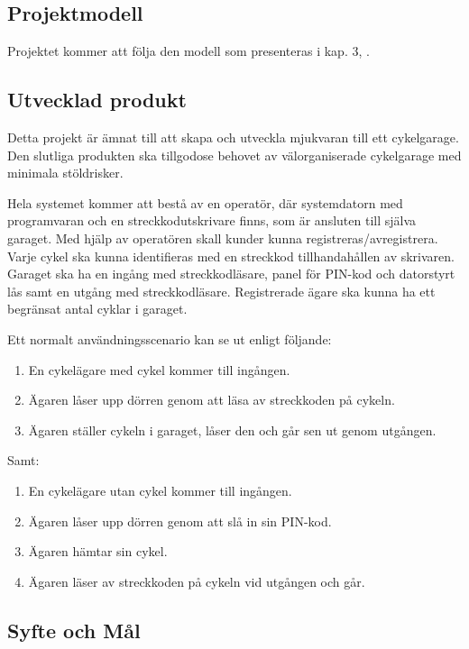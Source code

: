 \documentclass[a4paper]{article}
\begin{document}
\subsection{Projektmodell} %
Projektet kommer att följa den modell som presenteras i kap. 3, \cite{engproc}.

\subsection{Utvecklad produkt} %
Detta projekt är ämnat till att skapa och utveckla mjukvaran till ett cykelgarage. Den slutliga produkten ska
 tillgodose behovet av välorganiserade cykelgarage med minimala stöldrisker.

Hela systemet kommer att bestå av en operatör, där systemdatorn med programvaran och 
en streckkodutskrivare finns, som är ansluten till själva garaget. Med hjälp av operatören 
skall kunder kunna registreras/avregistrera. Varje cykel ska kunna identifieras med en 
streckkod tillhandahållen av skrivaren. Garaget ska ha en ingång med streckkodläsare, panel för 
PIN-kod och datorstyrt lås samt en utgång med streckkodläsare. Registrerade ägare ska kunna ha
 ett begränsat antal cyklar i garaget.

Ett normalt användningsscenario kan se ut enligt följande:

\begin{enumerate}
\item En cykelägare med cykel kommer till ingången.
\item Ägaren låser upp dörren genom att läsa av streckkoden på cykeln.
\item Ägaren ställer cykeln i garaget, låser den och går sen ut genom utgången.
\end{enumerate}

Samt:

\begin{enumerate}
\item En cykelägare utan cykel kommer till ingången.
\item Ägaren låser upp dörren genom att slå in sin PIN-kod.
\item Ägaren hämtar sin cykel.
\item Ägaren läser av streckkoden på cykeln vid utgången och går.
\end{enumerate}


\subsection{Syfte och Mål} %
\end{document}
